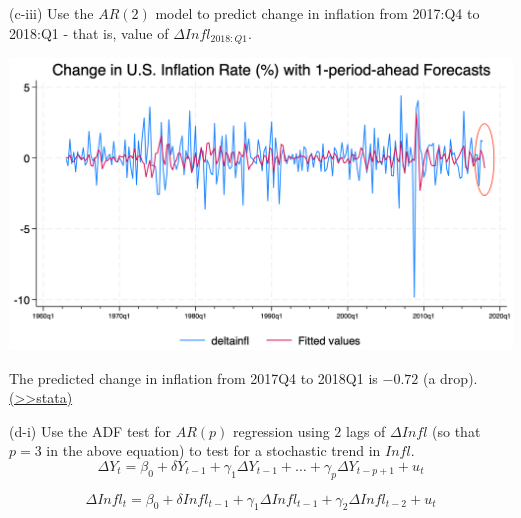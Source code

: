 \documentclass[
  10pt,
  ignorenonframetext,
]{beamer}
\begin{document}
\begin{frame}{(c-iii) Use the \(AR(2)\) model to predict change in
inflation from 2017:Q4 to 2018:Q1 - that is, value of
\(\Delta Infl_{2018:Q1}\).}
\protect\hypertarget{Plot-forecasting-A}{}
\begin{center}\includegraphics[width=0.85\linewidth]{pictures/Fig3-ForecastChangeInflationRate} \end{center}

\footnotesize The predicted change in inflation from 2017Q4 to 2018Q1 is
\(\mathbf{-0.72}\) (a
drop).\footnotesize \protect\hyperlink{Plot-forecasting}{(\textgreater\textgreater stata)}
\end{frame}

\begin{frame}{(d-i) Use the ADF test for \(AR(p)\) regression using
\(2\) lags of \(\Delta Infl\) (so that \(p = 3\) in the above equation)
to test for a stochastic trend in \(Infl\).}
\protect\hypertarget{d-i-use-the-adf-test-for-arp-regression-using-2-lags-of-delta-infl-so-that-p-3-in-the-above-equation-to-test-for-a-stochastic-trend-in-infl.}{}
\[
\Delta Y_t = \beta_0 + \delta Y_{t-1} + \gamma_1 \Delta Y_{t-1} +\ldots +\gamma_p \Delta Y_{t-p+1} + u_t
\]

\[
\Delta Infl_t = \beta_0 + \delta Infl_{t-1} + \gamma_1 \Delta Infl_{t-1} + \gamma_2 \Delta Infl_{t-2} + u_t
\]
\end{frame}
\end{document}
